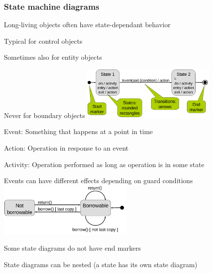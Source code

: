 \documentclass[10pt]{article}
\begin{document}
\subsubsection{State machine diagrams}
\enumstart
	\item Long-living objects often have state-dependant behavior
	\enumstart
		\item Typical for control objects
		\item Sometimes also for entity objects
		\item Never for boundary objects
	\enumend
	\includegraphics[width=0.5\textwidth]{state_diagram.png}
	\item Event: Something that happens at a point in time
	\item Action: Operation in response to an event
	\item Activity: Operation performed as long as operation is in some state
	\item Events can have different effects depending on guard conditions
	\\ \includegraphics[width=0.5\textwidth]{guard_condition.png}
	\item Some state diagrams do not have end markers
	\item State diagrams can be nested (a state has its own state diagram)
\enumend
\end{document}
